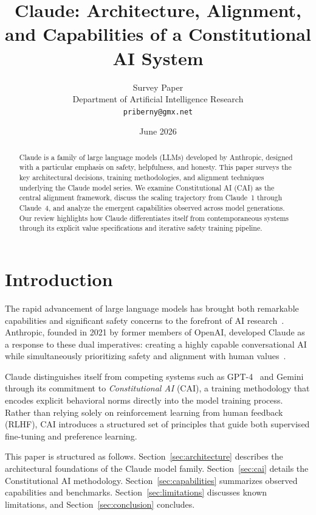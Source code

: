 \documentclass[10pt,twocolumn]{article}
\title{\textbf{Claude: Architecture, Alignment, and Capabilities of a Constitutional AI System}}
\author{
  Survey Paper\\[0.3em]
  \small Department of Artificial Intelligence Research\\
  \small \texttt{priberny@gmx.net}
}
\date{June 2026}
\begin{document}
\maketitle

\begin{abstract}
Claude is a family of large language models (LLMs) developed by Anthropic, designed with a particular emphasis on safety, helpfulness, and honesty. This paper surveys the key architectural decisions, training methodologies, and alignment techniques underlying the Claude model series. We examine Constitutional AI (CAI) as the central alignment framework, discuss the scaling trajectory from Claude~1 through Claude~4, and analyze the emergent capabilities observed across model generations. Our review highlights how Claude differentiates itself from contemporaneous systems through its explicit value specifications and iterative safety training pipeline.
\end{abstract}

\section{Introduction}

The rapid advancement of large language models has brought both remarkable capabilities and significant safety concerns to the forefront of AI research~\cite{bommasani2021}. Anthropic, founded in 2021 by former members of OpenAI, developed Claude as a response to these dual imperatives: creating a highly capable conversational AI while simultaneously prioritizing safety and alignment with human values~\cite{anthropic2023model}.

Claude distinguishes itself from competing systems such as GPT-4~\cite{openai2023} and Gemini~\cite{team2023gemini} through its commitment to \textit{Constitutional AI} (CAI), a training methodology that encodes explicit behavioral norms directly into the model training process. Rather than relying solely on reinforcement learning from human feedback (RLHF), CAI introduces a structured set of principles that guide both supervised fine-tuning and preference learning.

This paper is structured as follows. Section~\ref{sec:architecture} describes the architectural foundations of the Claude model family. Section~\ref{sec:cai} details the Constitutional AI methodology. Section~\ref{sec:capabilities} summarizes observed capabilities and benchmarks. Section~\ref{sec:limitations} discusses known limitations, and Section~\ref{sec:conclusion} concludes.
\end{document}

